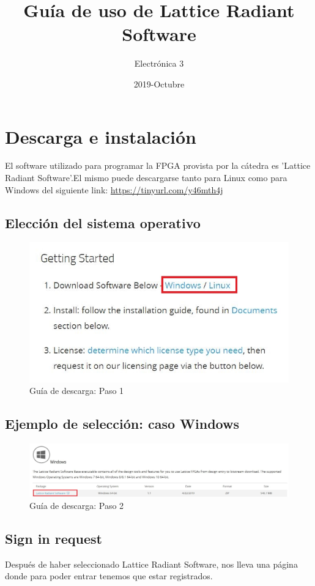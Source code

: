 \documentclass{article}
\title{Guía de uso de Lattice Radiant Software}
\date{2019-Octubre}
\author{Electrónica 3}
\begin{document}
\maketitle
{}
\newpage
{}

\tableofcontents
\pagebreak


\section{Descarga e instalación}
El software utilizado para programar la FPGA provista por la cátedra es 'Lattice Radiant Software'.El mismo puede descargarse tanto para Linux como para Windows del siguiente link: \url{https://tinyurl.com/y46mth4j}
\subsection{ Elección del sistema operativo}

\begin{figure}[H]
\centering
\includegraphics[width=0.4\linewidth]{Imagenes/1.JPG}
\caption{Guía de descarga: Paso 1}
\label{fig:step1}
\end{figure}


\subsection{ Ejemplo de selección: caso Windows}

\begin{figure}[H]
\centering
\includegraphics[width=1\linewidth]{Imagenes/2.JPG}
\caption{Guía de descarga: Paso 2}
\label{fig:step2}
\end{figure}

\subsection{Sign in request}
Después de haber seleccionado Lattice Radiant Software, nos lleva una página donde para poder entrar tenemos que estar registrados.
\end{document}
